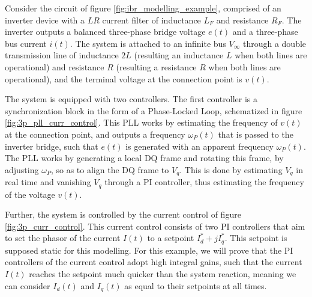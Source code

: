 \begin{example}\label{example:3p_eps_modelling}

	Consider the circuit of figure \ref{fig:ibr_modelling_example}, comprised of an inverter device with a $LR$ current filter of inductance $L_F$ and resistance $R_F$. The inverter outputs a balanced three-phase bridge voltage $e(t)$ and a three-phase bus current $i(t)$. The system is attached to an infinite bus $V_\infty$ through a double transmission line of inductance $2L$ (resulting an inductance $L$ when both lines are operational) and resistance $R$ (resulting a resistance $R$ when both lines are operational), and the terminal voltage at the connection point is $v(t)$.

	The system is equipped with two controllers. The first controller is a synchronization block in the form of a Phase-Locked Loop, schematized in figure \ref{fig:3p_pll_curr_control}. This PLL works by estimating the frequency of $v(t)$ at the connection point, and outputs a frequency $\omega_P(t)$ that is passed to the inverter bridge, such that $e(t)$ is generated with an apparent frequency $\omega_P(t)$. The PLL works by generating a local DQ frame and rotating this frame, by adjusting $\omega_P$, so as to align the DQ frame to $V_q$. This is done by estimating $V_q$ in real time and vanishing $V_q$ through a PI controller, thus estimating the frequency of the voltage $v(t)$.

	Further, the system is controlled by the current control of figure \ref{fig:3p_curr_control}. This current control consists of two PI controllers that aim to set the phasor of the current $I(t)$ to a setpoint $I_d^* + jI_q^*$. This setpoint is supposed static for this modelling. For this example, we will prove that the PI controllers of the current control adopt high integral gains, such that the current $I(t)$ reaches the setpoint much quicker than the system reaction, meaning we can consider $I_d(t)$ and $I_q(t)$ as equal to their setpoints at all times.

\begin{figure}[htb!]
\centering
\end{figure}
\end{example}
